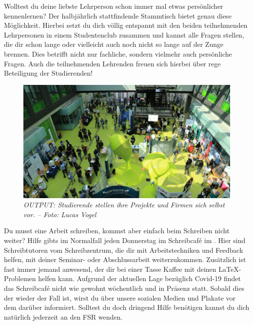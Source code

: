 
Wolltest du deine liebste Lehrperson schon immer mal etwas persönlicher kennenlernen? Der halbjährlich stattfindende Stammtisch bietet genau diese Möglichkeit. Hierbei setzt du dich völlig entspannt mit den beiden teilnehmenden Lehrpersonen in einem Studentenclub zusammen und kannst alle Fragen stellen, die dir schon lange oder vielleicht auch noch nicht so lange auf der Zunge brennen. Dies betrifft nicht nur fachliche, sondern vielmehr auch persönliche Fragen. Auch die teilnehmenden Lehrenden freuen sich hierbei über rege Beteiligung der Studierenden!

\begin{figure}[b!]
	\centering
  \includegraphics[width=.95\linewidth,keepaspectratio]{img/output}
  \caption*{\small \centering \textit{OUTPUT\@: Studierende stellen ihre Projekte und Firmen sich selbst vor. -- Foto: Lucas Vogel}}
\end{figure}%


Du musst eine Arbeit schreiben, kommst aber einfach beim Schreiben nicht weiter? Hilfe gibts im Normalfall jeden Donnerstag im Schreibcaf\'e im \ascii. Hier sind Schreibtutoren vom Schreibzentrum, die dir mit Arbeitstechniken und Feedback helfen, mit deiner Seminar- oder Abschlussarbeit weiterzukommen. Zusätzlich ist fast immer jemand anwesend, der dir bei einer Tasse Kaffee mit deinen \LaTeX-Problemen helfen kann.
Aufgrund der aktuellen Lage bezüglich Covid-19 findet das Schreibcaf\'e nicht wie gewohnt wöchentlich und in Präsenz statt. Sobald dies der wieder der Fall ist, wirst du über unsere sozialen Medien und Plakate vor dem \ascii  darüber informiert. 
Solltest du doch dringend Hilfe benötigen kannst du dich natürlich jederzeit an den FSR wenden.




